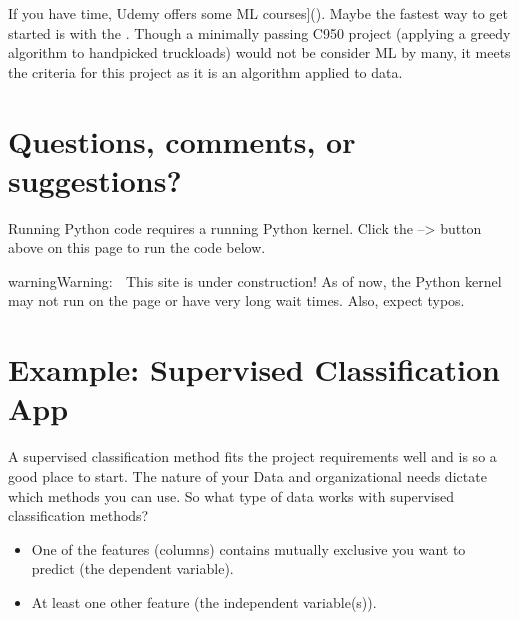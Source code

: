 \documentclass[letterpaper,10pt,english]{jupyterBook}
\begin{document}
\sphinxAtStartPar
If you have time, Udemy offers some ML courses{]}(). Maybe the fastest way to get started is with the . Though a minimally passing C950 project (applying a greedy algorithm to hand\sphinxhyphen{}picked truckloads) would not be consider ML by many, it meets the criteria for this project as it is an algorithm applied to data.


\section{Questions, comments, or suggestions?}
\label{\detokenize{task2_c/task2_part_c:questions-comments-or-suggestions}}


\sphinxstepscope



\sphinxAtStartPar
Running Python code requires a running Python kernel. Click the  –>  button above on this page to run the code below.

\begin{sphinxadmonition}{warning}{Warning:}
\sphinxAtStartPar
🚧 This site is under construction! As of now, the Python kernel may not run on the page or have very long wait times. Also, expect typos.👷🏽‍♀️
\end{sphinxadmonition}


\section{Example: Supervised Classification App}
\label{\detokenize{task2_c/example_sup_class/sup_class_ex:example-supervised-classification-app}}\label{\detokenize{task2_c/example_sup_class/sup_class_ex:sup-class-ex}}\label{\detokenize{task2_c/example_sup_class/sup_class_ex::doc}}
\sphinxAtStartPar
A supervised classification method fits the project requirements well and is so a good place to start. The nature of your Data and organizational needs dictate which methods you can use. So what type of data works with supervised classification methods?
\begin{itemize}
\item {} 
\sphinxAtStartPar
One of the features (columns) contains mutually exclusive  you want to predict (the dependent variable).

\item {} 
\sphinxAtStartPar
At least one other feature (the independent variable(s)).

\end{itemize}
\end{document}
